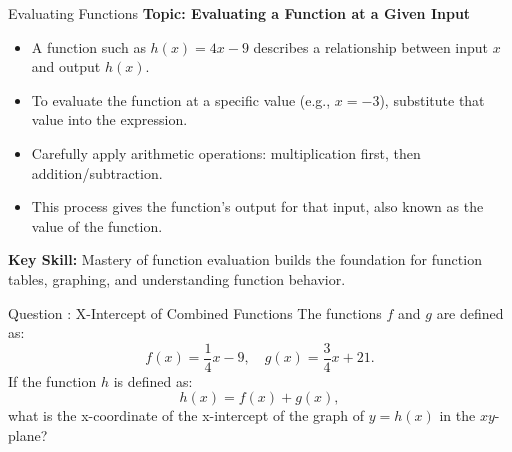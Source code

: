 \documentclass{beamer}
\begin{document}
\begin{frame}{Evaluating Functions}
    \textbf{Topic: Evaluating a Function at a Given Input}

    \begin{itemize}
        \item A function such as \( h(x) = 4x - 9 \) describes a relationship between input \(x\) and output \(h(x)\).
        \item To evaluate the function at a specific value (e.g., \(x = -3\)), substitute that value into the expression.
        \item Carefully apply arithmetic operations: multiplication first, then addition/subtraction.
        \item This process gives the function's output for that input, also known as the value of the function.
    \end{itemize}

    \vspace{1em}
    \textbf{Key Skill:}  
    Mastery of function evaluation builds the foundation for function tables, graphing, and understanding function behavior.
\end{frame}









\begin{frame}{Question : X-Intercept of Combined Functions}
    The functions \( f \) and \( g \) are defined as:
    \[
    f(x) = \frac{1}{4}x - 9, \quad g(x) = \frac{3}{4}x + 21.
    \]
    If the function \( h \) is defined as:
    \[
    h(x) = f(x) + g(x),
    \]
    what is the x-coordinate of the x-intercept of the graph of \( y = h(x) \) in the \( xy \)-plane?
\end{frame}
\end{document}

